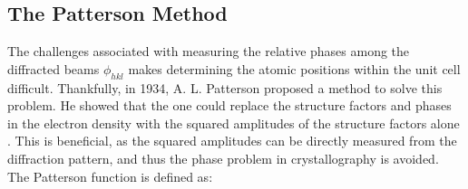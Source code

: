 \documentclass[aps,prb,twocolumn,superscriptaddress]{revtex4-2}
\begin{document}
\subsection{The Patterson Method}
\label{sec:patterson}
The challenges associated with measuring the relative phases among the diffracted 
beams $\phi_{hkl}$ makes determining the atomic positions within the unit cell 
difficult. Thankfully, in 1934, A. L. Patterson proposed a method to solve this 
problem. He showed that the one could replace the structure factors and 
phases in the electron density with the squared amplitudes of the structure factors 
alone \cite{Patterson1934}. This is beneficial, as the squared amplitudes can 
be directly measured from the diffraction pattern, and thus  the phase problem 
in crystallography is avoided. The Patterson function is defined as:
\end{document}
